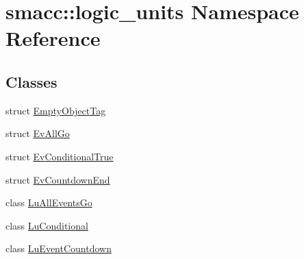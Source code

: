 \hypertarget{namespacesmacc_1_1logic__units}{}\section{smacc\+:\+:logic\+\_\+units Namespace Reference}
\label{namespacesmacc_1_1logic__units}
\subsection*{Classes}
\begin{DoxyCompactItemize}
\item 
struct \hyperlink{structsmacc_1_1logic__units_1_1EmptyObjectTag}{Empty\+Object\+Tag}
\item 
struct \hyperlink{structsmacc_1_1logic__units_1_1EvAllGo}{Ev\+All\+Go}
\item 
struct \hyperlink{structsmacc_1_1logic__units_1_1EvConditionalTrue}{Ev\+Conditional\+True}
\item 
struct \hyperlink{structsmacc_1_1logic__units_1_1EvCountdownEnd}{Ev\+Countdown\+End}
\item 
class \hyperlink{classsmacc_1_1logic__units_1_1LuAllEventsGo}{Lu\+All\+Events\+Go}
\item 
class \hyperlink{classsmacc_1_1logic__units_1_1LuConditional}{Lu\+Conditional}
\item 
class \hyperlink{classsmacc_1_1logic__units_1_1LuEventCountdown}{Lu\+Event\+Countdown}
\end{DoxyCompactItemize}
